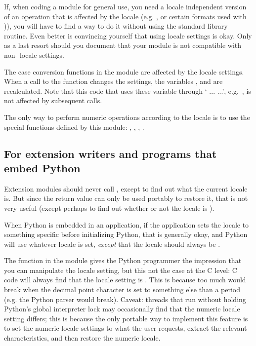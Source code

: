 If, when coding a module for general use, you need a locale
independent version of an operation that is affected by the locale
(e.g. , or certain formats used with
)), you will have to find a way to do it
without using the standard library routine.  Even better is convincing
yourself that using locale settings is okay.  Only as a last resort
should you document that your module is not compatible with
non- locale settings.

The case conversion functions in the
 module are affected by the
locale settings.  When a call to the  function
changes the  settings, the variables
,  and
 are recalculated.  Note that this code that uses
these variable through ` ...  ...',
e.g.\ , is not affected by subsequent
 calls.

The only way to perform numeric operations according to the locale
is to use the special functions defined by this module:
, , ,
.

\subsection{For extension writers and programs that embed Python
            \label{embedding-locale}}

Extension modules should never call , except to
find out what the current locale is.  But since the return value can
only be used portably to restore it, that is not very useful (except
perhaps to find out whether or not the locale is ).

When Python is embedded in an application, if the application sets the
locale to something specific before initializing Python, that is
generally okay, and Python will use whatever locale is set,
\emph{except} that the  locale should always be
.

The  function in the  module
gives the Python programmer the impression that you can manipulate the
 locale setting, but this not the case at the C
level: C code will always find that the  locale
setting is .  This is because too much would break when the
decimal point character is set to something else than a period
(e.g. the Python parser would break).  Caveat: threads that run
without holding Python's global interpreter lock may occasionally find
that the numeric locale setting differs; this is because the only
portable way to implement this feature is to set the numeric locale
settings to what the user requests, extract the relevant
characteristics, and then restore the  numeric locale.

